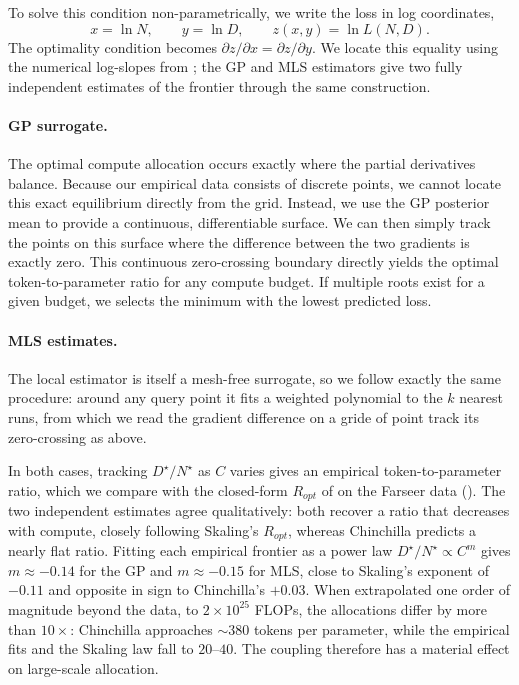 \documentclass[]{fairmeta}
\newcommand{\ska}{Skaling}
\begin{document}
To solve this condition non-parametrically, we write the loss in log coordinates,
\[
x=\ln N,\qquad y=\ln D,\qquad z(x,y)=\ln L(N,D).
\]
The optimality condition becomes $\partial z/\partial x=\partial z/\partial y$. We locate this equality using the numerical log-slopes from ; the GP and MLS estimators give two fully independent estimates of the frontier through the same construction.

\paragraph{GP surrogate.} The optimal compute allocation occurs exactly where the partial derivatives balance. Because our empirical data consists of discrete points, we cannot locate this exact equilibrium directly from the grid. Instead, we use the GP posterior mean to provide a continuous, differentiable surface. We can then simply track the points on this surface where the difference between the two gradients is exactly zero. This continuous zero-crossing boundary directly yields the optimal token-to-parameter ratio for any compute budget. If multiple roots exist for a given budget, we selects the minimum with the lowest predicted loss.

\paragraph{MLS estimates.} The local estimator is itself a mesh-free surrogate, so we follow exactly the same procedure: around any query point it fits a weighted polynomial to the $k$ nearest runs, from which we read the gradient difference on a gride of point track its zero-crossing as above.

In both cases, tracking $D^\star/N^\star$ as $C$ varies gives an empirical token-to-parameter ratio, which we compare with the closed-form $R_{opt}$ of  on the Farseer data (). The two independent estimates agree qualitatively: both recover a ratio that decreases with compute, closely following \ska{}'s $R_{opt}$, whereas Chinchilla predicts a nearly flat ratio. Fitting each empirical frontier as a power law $D^\star/N^\star\propto C^{m}$ gives $m\approx-0.14$ for the GP and $m\approx-0.15$ for MLS, close to \ska{}'s exponent of $-0.11$ and opposite in sign to Chinchilla's $+0.03$. When extrapolated one order of magnitude beyond the data, to $2\times10^{25}$ FLOPs, the allocations differ by more than $10\times$: Chinchilla approaches $\sim\!380$ tokens per parameter, while the empirical fits and the \ska{} law fall to $20$--$40$. The coupling therefore has a material effect on large-scale allocation.
\end{document}
